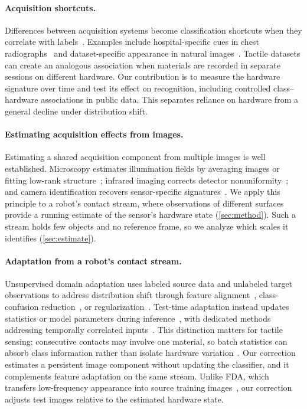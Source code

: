 \paragraph{Acquisition shortcuts.}
Differences between acquisition systems become classification shortcuts when they correlate with labels~\cite{geirhos2020shortcut}. Examples include hospital-specific cues in chest radiographs~\cite{zech2018hospital,degrave2021covid} and dataset-specific appearance in natural images~\cite{torralba2011bias,liuhe2025}. Tactile datasets can create an analogous association when materials are recorded in separate sessions on different hardware. Our contribution is to measure the hardware signature over time and test its effect on recognition, including controlled class--hardware associations in public data. This separates reliance on hardware from a general decline under distribution shift.

\paragraph{Estimating acquisition effects from images.}
Estimating a shared acquisition component from multiple images is well established. Microscopy estimates illumination fields by averaging images or fitting low-rank structure~\cite{singh2014illumination,peng2017basic}; infrared imaging corrects detector nonuniformity~\cite{harris1999nuc}; and camera identification recovers sensor-specific signatures~\cite{lukas2006prnu}. We apply this principle to a robot's contact stream, where observations of different surfaces provide a running estimate of the sensor's hardware state (\cref{sec:method}). Such a stream holds few objects and no reference frame, so we analyze which scales it identifies (\cref{sec:estimate}).

\paragraph{Adaptation from a robot's contact stream.}
Unsupervised domain adaptation uses labeled source data and unlabeled target observations to address distribution shift through feature alignment~\cite{ganin2016dann,long2018cdan}, class-confusion reduction~\cite{jin2020mcc}, or regularization~\cite{rangwani2022sdat,hoyer2023mic}. Test-time adaptation instead updates statistics or model parameters during inference~\cite{li2018adabn,wang2021tent,niu2023sar,lee2024deyo}, with dedicated methods addressing temporally correlated inputs~\cite{gong2022note,boudiaf2022lame,yuan2023rotta}. This distinction matters for tactile sensing: consecutive contacts may involve one material, so batch statistics can absorb class information rather than isolate hardware variation~\cite{burns2021bn}. Our correction estimates a persistent image component without updating the classifier, and it complements feature adaptation on the same stream. Unlike FDA, which transfers low-frequency appearance into source training images~\cite{fda2020}, our correction adjusts test images relative to the estimated hardware state.